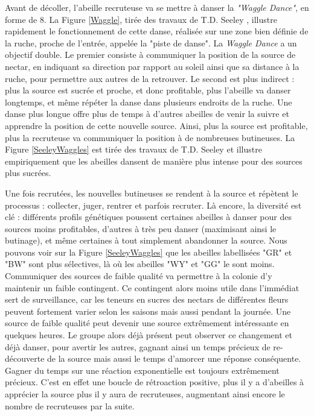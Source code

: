 	Avant de décoller, l'abeille recruteuse va se mettre à danser la \textit{"Waggle Dance"}, en forme de 8. La Figure \ref{Waggle}, tirée des travaux de T.D. Seeley \cite{seeley_wisdom_1995}, illustre rapidement le fonctionnement de cette danse, réalisée sur une zone bien définie de la ruche, proche de l'entrée, appelée la "piste de danse". La \textit{Waggle Dance} a un objectif double. Le premier consiste à communiquer la position de la source de nectar, en indiquant sa direction par rapport au soleil ainsi que sa distance à la ruche, pour permettre aux autres de la retrouver. Le second est plus indirect : plus la source est sucrée et proche, et donc profitable, plus l'abeille va danser longtemps, et même répéter la danse dans plusieurs endroits de la ruche. Une danse plus longue offre plus de temps à d'autres abeilles de venir la suivre et apprendre la position de cette nouvelle source. Ainsi, plus la source est profitable, plus la recruteuse va communiquer la position à de nombreuses butineuses. La Figure \ref{SeeleyWaggles} est tirée des travaux de T.D. Seeley \cite{seeley_wisdom_1995} et illustre empiriquement que les abeilles dansent de manière plus intense pour des sources plus sucrées.
			
			Une fois recrutées, les nouvelles butineuses se rendent à la source et répètent le processus : collecter, juger, rentrer et parfois recruter. Là encore, la diversité est clé : différents profils génétiques poussent certaines abeilles à danser pour des sources moins profitables, d'autres à très peu danser (maximisant ainsi le butinage), et même certaines à tout simplement abandonner la source. Nous pouvons voir sur la Figure \ref{SeeleyWaggles} que les abeilles labellisées "GR" et "BW" sont plus sélectives, là où les abeilles "WY" et "GG" le sont moins. Communiquer des sources de faible qualité va permettre à la colonie d'y maintenir un faible contingent. Ce contingent alors moins utile dans l'immédiat sert de surveillance, car les teneurs en sucres des nectars de différentes fleurs peuvent fortement varier selon les saisons mais aussi pendant la journée. 
			Une source de faible qualité peut devenir une source extrêmement intéressante en quelques heures. Le groupe alors déjà présent peut observer ce changement et déjà danser, pour avertir les autres, gagnant ainsi un temps précieux de re-découverte de la source mais aussi le temps d'amorcer une réponse conséquente. Gagner du temps sur une réaction exponentielle est toujours extrêmement précieux. 
			C'est en effet une boucle de rétroaction positive, plus il y a d'abeilles à apprécier la source plus il y aura de recruteuses, augmentant ainsi encore le nombre de recruteuses par la suite.
			
